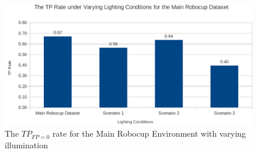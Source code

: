 
\begin{figure}[h!] 
  \centering
    \includegraphics[width=1.0\textwidth]{../Drawings/Graphs/tp_rate_lighting.pdf}
    \caption{The $TP_{FP=0}$ rate for the Main Robocup Environment with varying illumination}
    \label{fig:tp_rate_lighting}
\end{figure}






